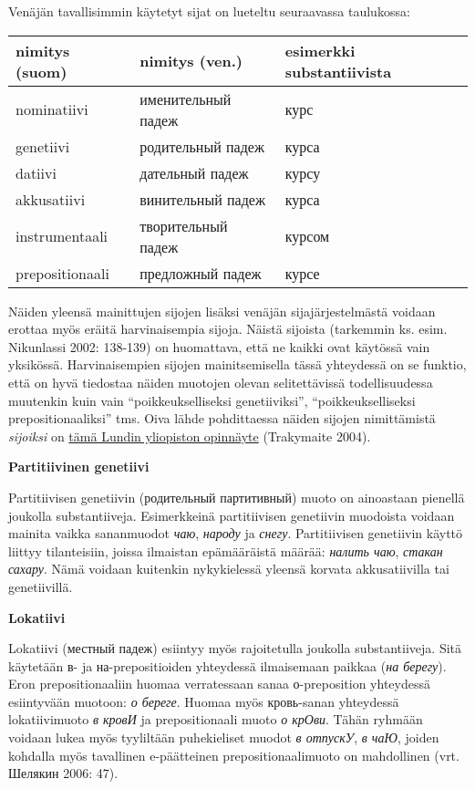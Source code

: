 \documentclass[]{scrartcl}
\begin{document}
Venäjän tavallisimmin käytetyt sijat on lueteltu seuraavassa taulukossa:

\begin{longtable}[c]{@{}lll@{}}
\toprule
nimitys (suom) & nimitys (ven.) & esimerkki
substantiivista\tabularnewline
\midrule
\endhead
nominatiivi & именительный падеж & курс\tabularnewline
genetiivi & родительный падеж & курса\tabularnewline
datiivi & дательный падеж & курсу\tabularnewline
akkusatiivi & винительный падеж & курса\tabularnewline
instrumentaali & творительный падеж & курсом\tabularnewline
prepositionaali & предложный падеж & курсе\tabularnewline
\bottomrule
\end{longtable}

Näiden yleensä mainittujen sijojen lisäksi venäjän sijajärjestelmästä
voidaan erottaa myös eräitä harvinaisempia sijoja. Näistä sijoista
(tarkemmin ks. esim. Nikunlassi 2002: 138-139) on huomattava, että ne
kaikki ovat käytössä vain yksikössä. Harvinaisempien sijojen
mainitsemisella tässä yhteydessä on se funktio, että on hyvä tiedostaa
näiden muotojen olevan selitettävissä todellisuudessa muutenkin kuin
vain ``poikkeukselliseksi genetiiviksi'', ``poikkeukselliseksi
prepositionaaliksi'' tms. Oiva lähde pohdittaessa näiden sijojen
nimittämistä \emph{sijoiksi} on
\href{http://lup.lub.lu.se/luur/download?func=downloadFile\&recordOId=3810042\&fileOId=3810043}{tämä
Lundin yliopiston opinnäyte} (Trakymaite 2004).

\textbf{Partitiivinen genetiivi}

Partitiivisen genetiivin (родительный партитивный) muoto on ainoastaan
pienellä joukolla substantiiveja. Esimerkkeinä partitiivisen genetiivin
muodoista voidaan mainita vaikka sananmuodot \emph{чаю}, \emph{народу}
ja \emph{снегу}. Partitiivisen genetiivin käyttö liittyy tilanteisiin,
joissa ilmaistan epämääräistä määrää: \emph{налить чаю}, \emph{стакан
сахару}. Nämä voidaan kuitenkin nykykielessä yleensä korvata
akkusatiivilla tai genetiivillä.

\textbf{Lokatiivi}

Lokatiivi (местный падеж) esiintyy myös rajoitetulla joukolla
substantiiveja. Sitä käytetään в- ja на-prepositioiden yhteydessä
ilmaisemaan paikkaa (\emph{на берегу}). Eron prepositionaaliin huomaa
verratessaan sanaa о-preposition yhteydessä esiintyvään muotoon: \emph{о
береге}. Huomaa myös кровь-sanan yhteydessä lokatiivimuoto \emph{в
кровИ} ja prepositionaali muoto \emph{о крОви}. Tähän ryhmään voidaan
lukea myös tyyliltään puhekieliset muodot \emph{в отпускУ}, \emph{в
чаЮ}, joiden kohdalla myös tavallinen e-päätteinen prepositionaalimuoto
on mahdollinen (vrt. Шелякин 2006: 47).
\end{document}
